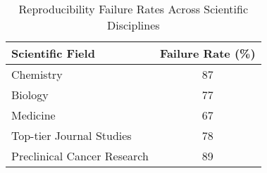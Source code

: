 \begin{table}[h]
    \centering
    \caption{Reproducibility Failure Rates Across Scientific Disciplines}
    \begin{tabular}{|l|c|}
        \hline
        \textbf{Scientific Field}   & \textbf{Failure Rate (\%)} \\
        \hline
        Chemistry                   & 87                         \\
        Biology                     & 77                         \\
        Medicine                    & 67                         \\
        Top-tier Journal Studies    & 78                         \\
        Preclinical Cancer Research & 89                         \\
        \hline
    \end{tabular}
    \label{tab:reproducibility}
\end{table}



\renewcommand{\arraystretch}{1.5}

